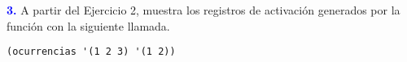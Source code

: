 \textbf{\textcolor{blue}{3.}} \Large
A partir del Ejercicio 2, muestra los registros de activación generados por la función con
la siguiente llamada.
\begin{lstlisting}
(ocurrencias '(1 2 3) '(1 2))
\end{lstlisting}
